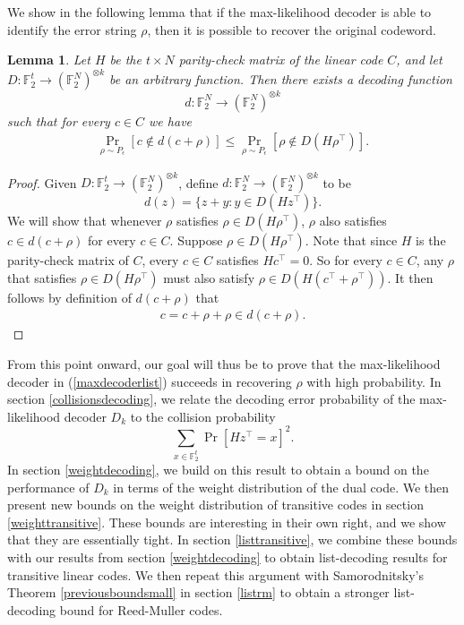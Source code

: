 \documentclass[12pt]{article}
\newtheorem{lemma}[theorem]{Lemma}
\begin{document}
We show in the following lemma that if the max-likelihood decoder is able to identify the error string $\rho$, then it is possible to recover the original codeword. 
\begin{lemma}\label{eqvltdecoder}
Let $H$ be the $t\times N$ parity-check matrix of the linear code $C$, and let $D:\mathbb{F}_2^t\rightarrow \left(\mathbb{F}_2^N\right)^{\otimes{k}}$
be an arbitrary function. Then there exists a decoding function $$d:\mathbb{F}_2^N\rightarrow\left(\mathbb{F}_2^N\right)^{\otimes{k}}$$ such that for every $c\in C$ we have
\begin{align*}
\Pr_{\rho\sim P_\epsilon}[c\notin d(c+\rho)]\leq \Pr_{\rho\sim P_\epsilon}[\rho\notin D(H\rho^\intercal)].
\end{align*}
\end{lemma}
\begin{proof}
Given $D:\mathbb{F}_2^t\rightarrow \left(\mathbb{F}_2^N\right)^{\otimes{k}}$, define $d:\mathbb{F}_2^N\rightarrow\left(\mathbb{F}_2^N\right)^{\otimes{k}}$ to be
$$d(z)=\{z+y:y\in D(Hz^\intercal)\}.$$
We will show that whenever $\rho$ satisfies $\rho\in D(H\rho^\intercal)$, $\rho$ also satisfies $c\in d(c+\rho)$ for every $c\in C$. Suppose $\rho\in D(H\rho^\intercal)$. Note that since $H$ is the parity-check matrix of $C$, every $c\in C$ satisfies $Hc^\intercal=0$. So for every $c\in C$, any $\rho $ that satisfies $\rho\in D(H\rho^\intercal)$ must also satisfy $\rho\in D(H(c^\intercal+\rho^\intercal))$. It then follows by definition of $d(c+\rho)$ that 
\begin{align*}
    c=c+\rho+\rho\in d(c+\rho).
\end{align*}
\end{proof}
From this point onward, our goal will thus be to prove that the max-likelihood decoder in (\ref{maxdecoderlist}) succeeds in recovering $\rho$ with high probability. 
In section \ref{collisionsdecoding}, we relate the decoding error probability of the max-likelihood decoder $D_k$ to the collision probability $$\sum_{x\in\mathbb{F}_2^t}\Pr[Hz^\intercal=x]^2.$$ 
In section \ref{weightdecoding}, we build on this result to obtain a bound on the performance of $D_k$ in terms of the weight distribution of the dual code.
We then present new bounds on the weight distribution of transitive codes in section \ref{weighttransitive}. These bounds are interesting in their own right, and we show that they are essentially tight.
In section \ref{listtransitive}, we combine these bounds with our results from section \ref{weightdecoding} to obtain list-decoding results for transitive linear codes. We then repeat this argument with Samorodnitsky's Theorem \ref{previousboundsmall} in section \ref{listrm} to obtain a stronger list-decoding bound for Reed-Muller codes. 
\end{document}
